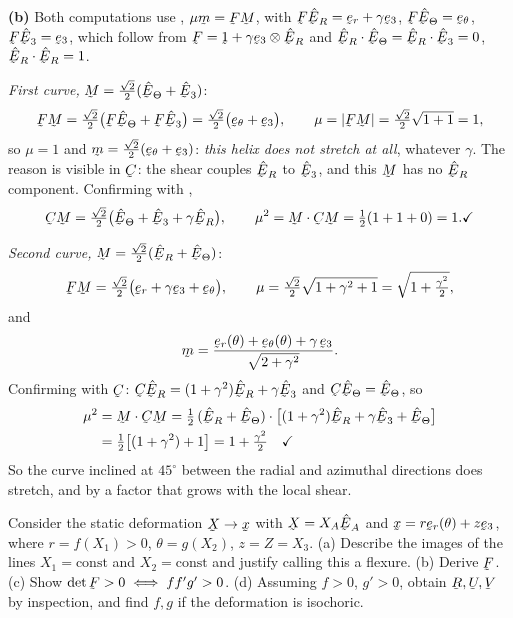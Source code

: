\begin{solution}
\textbf{(b)} Both computations use , $\mu\bm=\bF\bM$, with
$\bF\hER=\ber+\gamma\be_{3}$, $\bF\hETh=\bet$, $\bF\hbE_{3}=\be_{3}$,
which follow from $\bF=\shift+\gamma\be_{3}\otimes\hER$ and
$\ip{\hER}{\hETh}=\ip{\hER}{\hbE_{3}}=0$, $\ip{\hER}{\hER}=1$.

\emph{First curve,} $\bM=\tfrac{\sqrt2}{2}(\hETh+\hbE_{3})$:
\[
   \bF\bM=\tfrac{\sqrt2}{2}\big(\bF\hETh+\bF\hbE_{3}\big)
        =\tfrac{\sqrt2}{2}\big(\bet+\be_{3}\big),
   \qquad
   \mu=|\bF\bM|=\tfrac{\sqrt2}{2}\sqrt{1+1}=1 ,
\]
so $\mu=1$ and $\bm=\tfrac{\sqrt2}{2}(\bet+\be_{3})$: \emph{this helix
does not stretch at all}, whatever $\gamma$. The reason is visible in
$\bC$: the shear couples $\hER$ to $\hbE_{3}$, and this $\bM$ has no
$\hER$ component. Confirming with ,
\[
   \bC\bM=\tfrac{\sqrt2}{2}\big(\hETh+\hbE_{3}+\gamma\hER\big),
   \qquad
   \mu^{2}=\ip\bM{\bC\bM}=\tfrac12(1+1+0)=1 . \checkmark
\]

\emph{Second curve,} $\bM=\tfrac{\sqrt2}{2}(\hER+\hETh)$:
\[
   \bF\bM=\tfrac{\sqrt2}{2}\big(\ber+\gamma\be_{3}+\bet\big),
   \qquad
   \mu=\tfrac{\sqrt2}{2}\sqrt{1+\gamma^{2}+1}
     =\sqrt{1+\tfrac{\gamma^{2}}{2}} ,
\]
and
\[
   \bm=\frac{\ber(\theta)+\bet(\theta)+\gamma\,\be_{3}}
            {\sqrt{2+\gamma^{2}}} .
\]
Confirming with $\bC$: $\bC\hER=(1+\gamma^{2})\hER+\gamma\hbE_{3}$ and
$\bC\hETh=\hETh$, so
\[
\begin{aligned}
   \mu^{2}&=\ip\bM{\bC\bM}
   =\tfrac12\,\ip{(\hER+\hETh)}
    {\big[(1+\gamma^{2})\hER+\gamma\hbE_{3}+\hETh\big]}\\
   &=\tfrac12\big[(1+\gamma^{2})+1\big]=1+\tfrac{\gamma^{2}}{2}
   \quad\checkmark
\end{aligned}
\]
So the curve inclined at $45^{\circ}$ between the radial and azimuthal
directions does stretch, and by a factor that grows with the local shear.
\end{solution}

\begin{problem}
Consider the static deformation $\bX\to\bx$ with $\bX=X_{A}\hbE_{A}$ and
$\bx=r\ber(\theta)+z\be_{3}$, where $r=f(X_{1})>0$, $\theta=g(X_{2})$,
$z=Z=X_{3}$.
(a) Describe the images of the lines $X_{1}=\text{const}$ and
$X_{2}=\text{const}$ and justify calling this a flexure.
(b) Derive $\bF$. (c) Show $\det\bF>0\iff ff'g'>0$.
(d) Assuming $f>0$, $g'>0$, obtain $\bR,\bU,\bV$ by inspection, and find
$f,g$ if the deformation is isochoric.
\end{problem}

